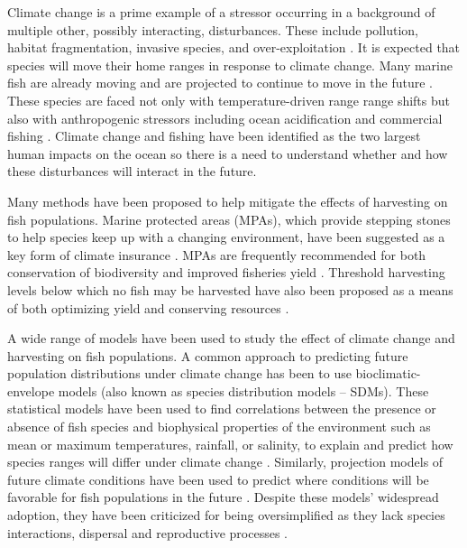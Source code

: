 \documentclass[]{article}
\begin{document}
Climate change is a prime example of a stressor occurring in a background of multiple other, possibly interacting, disturbances. These include pollution, habitat fragmentation, invasive species, and over-exploitation \citep{Wilcoveetal1998, Salaetal2000, MEA2005}. It is expected that  species will move their home ranges in response to climate change. Many marine fish are already moving \citep{Perryetal2005, HiddinkHoftstede2008, Rijnsdorpetal2009, Dulvyetal2008, Simpsonetal2011} and are projected to continue to move in the future \citep{Kelletal2005, Mackenzieetal2007}. These species are faced not only with temperature-driven range range shifts but also with anthropogenic stressors including ocean acidification and commercial fishing \citep{Pinskyetal2013, Barryetal1995, Nyeetal2009}. Climate change and fishing have been identified as the two largest human impacts on the ocean \citep{Halpernetal2008} so there is a need to understand whether and how these disturbances will interact in the future.

Many methods have been proposed to help mitigate the effects of harvesting on fish populations. Marine protected areas (MPAs), which provide stepping stones to help species keep up with a changing environment, have been suggested as a key form of climate insurance \citep{Thomasetal2012, Hannahetal2007}. MPAs are frequently recommended for both conservation of biodiversity and improved fisheries yield \citep{Gainesetal2010}. Threshold harvesting levels below which no fish may be harvested have also been proposed as a means of both optimizing yield and conserving resources \citep{Landeetal1995, Landeetal1997}.


A wide range of models have been used to study the effect of climate
change and harvesting on fish populations.  A common approach to predicting future population distributions under climate change has been to use bioclimatic-envelope models (also known as species distribution models -- SDMs). These statistical models have been
used to find correlations between the presence or absence of fish
species and biophysical properties of the environment such as mean or maximum
temperatures, rainfall, or salinity, to explain and predict how species
ranges will differ under climate change \citep{Elithetal2006, GuisanThuiller2005, GuisanZimmerman2000}. Similarly,
projection models of future climate conditions have been used to predict
where conditions will be favorable for fish populations in the future
\citep{Cheungetal2008, Cheungetal2009}.  Despite these models' widespread
adoption, they have  been criticized for being oversimplified
as they lack species interactions, dispersal and reproductive processes
\citep{KearneyPorter2009, Zarnetskeetal2012, Robinsonetal2011}. 
\end{document}
